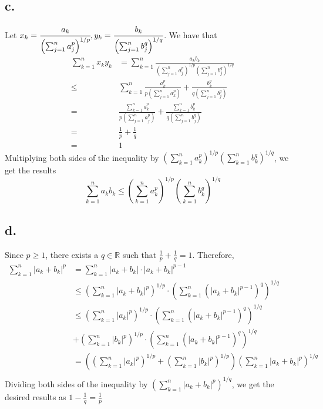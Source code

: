 \documentclass[11pt]{article}
\begin{document}
\subsection*{c.}
Let $x_k = \cfrac{a_k}{\left(\sum_{j=1}^n a_j^p \right)^{1/p}}, y_k = \cfrac{b_k}{\left(\sum_{j=1}^n b_j^q \right)^{1/q}}$.
We have that 
\begin{equation*}
    \begin{aligned}
        \sum_{k=1}^n x_ky_k &= \sum_{k=1}^n \frac{a_k b_k}{\left(\sum_{j=1}^n a_j^p \right)^{1/p} \left(\sum_{j=1}^n b_j^q \right)^{1/q}} \\
        \le & \sum_{k=1}^n 
        \frac{a_k^p}{p\left(\sum_{j=1}^n a_k^p \right)} 
        + \frac{b_k^q}{q\left(\sum_{j=1}^n b_j^q \right)}  \\
        =& \frac{\sum_{k=1}^n a_k^p}{p\left(\sum_{j=1}^n a_j^p \right)} 
        + \frac{\sum_{k=1}^n b_k^p}{q\left(\sum_{j=1}^n b_j^q \right)} \\
        =& \frac{1}{p} + \frac{1}{q} \\
        =& 1
    \end{aligned}
\end{equation*}
Multiplying both sides of the inequality by $\left(\sum_{k=1}^n a_k^p \right)^{1/p}\left(\sum_{k=1}^n b_k^q \right)^{1/q}$, we get the results 
\[
    \sum_{k=1}^n a_kb_k \le \left(\sum_{k=1}^n a_k^p \right)^{1/p}\left(\sum_{k=1}^n b_k^q \right)^{1/q}    
\]
\subsection*{d.}
Since $p\ge 1$, there exists a $q \in \mathbb{R}$ such that $\frac{1}{p}+ \frac{1}{q} = 1$. Therefore, 
\begin{equation*}
    \begin{aligned}
        \sum_{k=1}^n |a_k + b_k|^p 
        &= \sum_{k=1}^n |a_k + b_k| \cdot |a_k+b_k|^{p-1} \\
        &\le \left(\sum_{k=1}^n |a_k + b_k|^p \right)^{1/p} \cdot 
        \left( \sum_{k=1}^n (|a_k + b_k|^{p-1} )^q \right)^{1/q} \\
        &\le \left(\sum_{k=1}^n |a_k|^p \right)^{1/p} \cdot
        \left( \sum_{k=1}^n (|a_k + b_k|^{p-1} )^q \right)^{1/q} \\
        & +\left(\sum_{k=1}^n |b_k|^p \right)^{1/p} \cdot
        \left( \sum_{k=1}^n (|a_k + b_k|^{p-1} )^q \right)^{1/q} \\
        &= \left(\left(\sum_{k=1}^n |a_k|^p \right)^{1/p} 
        + \left(\sum_{k=1}^n |b_k|^p \right)^{1/p} \right)
        \left( \sum_{k=1}^n |a_k + b_k|^p \right)^{1/q} \\
    \end{aligned}
\end{equation*}
\pagebreak
Dividing both sides of the inequality by $\left( \sum_{k=1}^n |a_k + b_k|^p \right)^{1/q}$, we get the desired results as $1-\frac{1}{q}=\frac{1}{p}$
\end{document}
